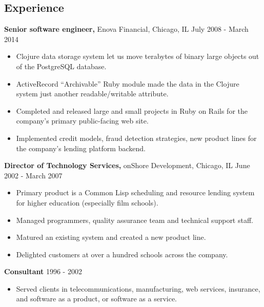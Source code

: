 \documentclass[margin]{res}
\begin{document}
\begin{resume}
\section{Experience}
 {\bf Senior software engineer,} Enova Financial, Chicago, IL \hfill July 2008 - March 2014
\begin{itemize} \itemsep -2pt %
\item Clojure data storage system let us move terabytes of binary large objects out of the PostgreSQL database.
\item ActiveRecord ``Archivable'' Ruby module made the data in the Clojure system just another readable/writable attribute.
\item Completed and released large and small projects in Ruby on Rails for the company's primary public-facing web site.
\item Implemented credit models, fraud detection strategies, new product lines for the company's lending platform backend.
\end{itemize}


 {\bf Director of Technology Services,} onShore Development, Chicago, IL \hfill June 2002 - March 2007
\begin{itemize} \itemsep -2pt %
\item Primary product is a Common Lisp scheduling and resource lending system for higher education (especially film schools).
\item Managed programmers, quality assurance team and technical support staff.
\item Matured an existing system and created a new product line.
\item Delighted customers at over a hundred schools across the company.
\end{itemize}

 {\bf Consultant} \hfill 1996 - 2002
\begin{itemize} \itemsep -2pt %
\item Served clients in telecommunications, manufacturing, web services, insurance, and software as a product, or software as a service.
\end{itemize}


\end{resume}
\end{document}
